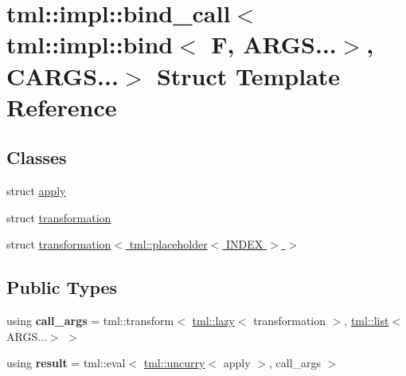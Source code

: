 \hypertarget{structtml_1_1impl_1_1bind__call_3_01tml_1_1impl_1_1bind_3_01_f_00_01_a_r_g_s_8_8_8_4_00_01_c_a_r_g_s_8_8_8_4}{\section{tml\+:\+:impl\+:\+:bind\+\_\+call$<$ tml\+:\+:impl\+:\+:bind$<$ F, A\+R\+G\+S...$>$, C\+A\+R\+G\+S...$>$ Struct Template Reference}
\label{structtml_1_1impl_1_1bind__call_3_01tml_1_1impl_1_1bind_3_01_f_00_01_a_r_g_s_8_8_8_4_00_01_c_a_r_g_s_8_8_8_4}
}
\subsection*{Classes}
\begin{DoxyCompactItemize}
\item 
struct \hyperlink{structtml_1_1impl_1_1bind__call_3_01tml_1_1impl_1_1bind_3_01_f_00_01_a_r_g_s_8_8_8_4_00_01_c_a_r_g_s_8_8_8_4_1_1apply}{apply}
\item 
struct \hyperlink{structtml_1_1impl_1_1bind__call_3_01tml_1_1impl_1_1bind_3_01_f_00_01_a_r_g_s_8_8_8_4_00_01_c_a_r_g_s_8_8_8_4_1_1transformation}{transformation}
\item 
struct \hyperlink{structtml_1_1impl_1_1bind__call_3_01tml_1_1impl_1_1bind_3_01_f_00_01_a_r_g_s_8_8_8_4_00_01_c_a_re2c1dd0176c648dfd458dbcdff116bba}{transformation$<$ tml\+::placeholder$<$ I\+N\+D\+E\+X $>$ $>$}
\end{DoxyCompactItemize}
\subsection*{Public Types}
\begin{DoxyCompactItemize}
\item 
\hypertarget{structtml_1_1impl_1_1bind__call_3_01tml_1_1impl_1_1bind_3_01_f_00_01_a_r_g_s_8_8_8_4_00_01_c_a_r_g_s_8_8_8_4_a92eef5b5f7b56d49c6603275dc2b6cf5}{using {\bfseries call\+\_\+args} = tml\+::transform$<$ \hyperlink{structtml_1_1lazy}{tml\+::lazy}$<$ transformation $>$, \hyperlink{structtml_1_1list}{tml\+::list}$<$ A\+R\+G\+S...$>$ $>$}\label{structtml_1_1impl_1_1bind__call_3_01tml_1_1impl_1_1bind_3_01_f_00_01_a_r_g_s_8_8_8_4_00_01_c_a_r_g_s_8_8_8_4_a92eef5b5f7b56d49c6603275dc2b6cf5}

\item 
\hypertarget{structtml_1_1impl_1_1bind__call_3_01tml_1_1impl_1_1bind_3_01_f_00_01_a_r_g_s_8_8_8_4_00_01_c_a_r_g_s_8_8_8_4_a204ea8e2d414633d6158ec4bf142d8ce}{using {\bfseries result} = tml\+::eval$<$ \hyperlink{structtml_1_1uncurry}{tml\+::uncurry}$<$ apply $>$, call\+\_\+args $>$}\label{structtml_1_1impl_1_1bind__call_3_01tml_1_1impl_1_1bind_3_01_f_00_01_a_r_g_s_8_8_8_4_00_01_c_a_r_g_s_8_8_8_4_a204ea8e2d414633d6158ec4bf142d8ce}

\end{DoxyCompactItemize}



